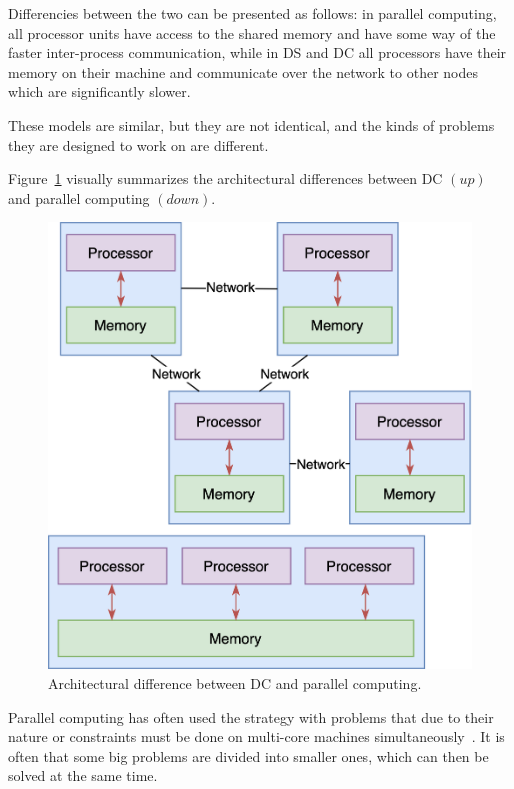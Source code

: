Differencies between the two can be presented as follows: in parallel computing, all processor units have access to the shared memory and have some way of the faster inter-process communication, while in DS and DC all processors have their memory on their machine and communicate over the network to other nodes which are significantly slower. 

These models are similar, but they are not identical, and the kinds of problems they are designed to work on are different. 

Figure~\ref{fig:fig4} visually summarizes the architectural  differences between DC $(up)$ and parallel computing $(down)$.

\begin{figure}[H]
	\begin{center}
		\includegraphics[scale=0.8]{images/Figure4.png}
	\end{center}
	\vspace{-0.6cm}
	\caption{Architectural difference between DC and parallel computing.}
	\label{fig:fig4}
\end{figure}

\noindent
Parallel computing has often used the strategy with problems that due to their nature or constraints must be done on multi-core machines simultaneously~\cite{0072397}. It is often that some big problems are divided into smaller ones, which can then be solved at the same time. 

